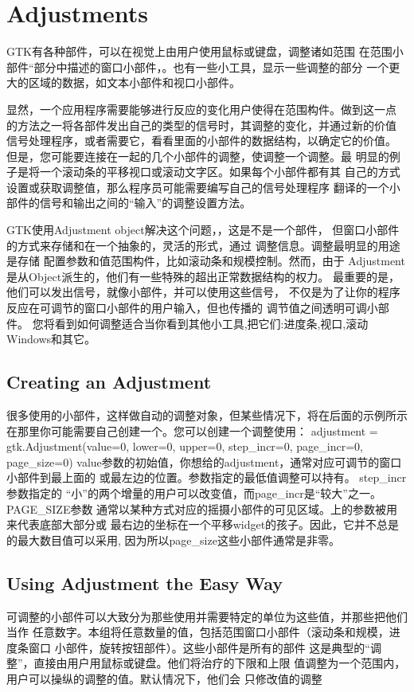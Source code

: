 \chapter{Adjustments}
GTK有各种部件，可以在视觉上由用户使用鼠标或键盘，调整诸如范围
在范围小部件“部分中描述的窗口小部件，。也有一些小工具，显示一些调整的部分
一个更大的区域的数据，如文本小部件和视口小部件。

显然，一个应用程序需要能够进行反应的变化用户使得在范围构件。做到这一点
的方法之一将各部件发出自己的类型的信号时，其调整的变化，并通过新的价值
信号处理程序，或者需要它，看看里面的小部件的数据结构，以确定它的价值。
但是，您可能要连接在一起的几个小部件的调整，使调整一个调整。最
明显的例子是将一个滚动条的平移视口或滚动文字区。如果每个小部件都有其
自己的方式设置或获取调整值，那么程序员可能需要编写自己的信号处理程序
翻译的一个小部件的信号和输出之间的“输入”的调整设置方法。

GTK使用Adjustment object解决这个问题，，这是不是一个部件，
但窗口小部件的方式来存储和在一个抽象的，灵活的形式，通过
调整信息。调整最明显的用途是存储
配置参数和值范围构件，比如滚动条和规模控制。然而，由于
Adjustment是从Object派生的，他们有一些特殊的超出正常数据结构的权力。
最重要的是，他们可以发出信号，就像小部件，并可以使用这些信号，
不仅是为了让你的程序反应在可调节的窗口小部件的用户输入，但也传播的
调节值之间透明可调小部件。
您将看到如何调整适合当你看到其他小工具,把它们:进度条,视口,滚动Windows和其它。	
\section{Creating an Adjustment}
很多使用的小部件，这样做自动的调整对象，但某些情况下，将在后面的示例所示
在那里你可能需要自己创建一个。您可以创建一个调整使用：
adjustment = gtk.Adjustment(value=0, lower=0, upper=0, step_incr=0,
	page_incr=0, page_size=0)
value参数的初始值，你想给的adjustment，通常对应可调节的窗口小部件到最上面的
或最左边的位置。参数指定的最低值调整可以持有。 step_incr参数指定的
“小”的两个增量的用户可以改变值，而page_incr是“较大”之一。 PAGE_SIZE参数
通常以某种方式对应的摇摄小部件的可见区域。上的参数被用来代表底部大部分或
最右边的坐标在一个平移widget的孩子。因此，它并不总是的最大数目值可以采用,
因为所以page_size这些小部件通常是非零。
\section{Using Adjustment the Easy Way}
可调整的小部件可以大致分为那些使用并需要特定的单位为这些值，并那些把他们当作
任意数字。本组将任意数量的值，包括范围窗口小部件（滚动条和规模，进度条窗口
小部件，旋转按钮部件）。这些小部件是所有的部件
这是典型的“调整”，直接由用户用鼠标或键盘。他们将治疗的下限和上限
值调整为一个范围内，用户可以操纵的调整的值。默认情况下，他们会
只修改值的调整


